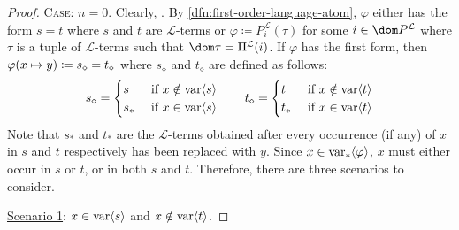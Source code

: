 \begin{proof}
    \vspace{0.3cm}
    \noindent
    {\scshape Case:} \( n = 0 \). Clearly, .
    By \cref{dfn:first-order-language-atom}, \( \varphi \) either has the form \( s = t \) where \( s \) and \( t \) are \( \mathcal{L} \)-terms
    or \( \varphi \coloneq P^{\mathcal{L}}_{i}(\tau) \) for some \( i \in \dom P^{\mathcal{L}} \) where \( \tau \) is a tuple of \( \mathcal{L} \)-terms such that
    \( \dom \tau = \Pi^{\mathcal{L}}(i) \).
    If \( \varphi \) has the first form, then \( \folfreevariablereplacement{\varphi}{x}{y} \coloneq s_{\diamond} = t_{\diamond} \) where \( s_{\diamond} \) and \( t_{\diamond} \)
    are defined as follows:
    \begin{equation}
        \label{eq:define-s-star-and-t-star-where-x-is-replaced-with-y}
        s_{\diamond} =
        \begin{cases}
            s \ &\text{if} \ x \notin \operatorname{var} \langle s\rangle \\
            s_{\ast} \ &\text{if} \ x \in \operatorname{var} \langle s\rangle
        \end{cases}
        \qquad
        t_{\diamond} =
        \begin{cases}
            t \ &\text{if} \ x \notin \operatorname{var} \langle t\rangle \\
            t_{\ast} \ &\text{if} \ x \in \operatorname{var} \langle t\rangle
        \end{cases}
    \end{equation}
    Note that \( s_{\ast} \) and \( t_{\ast} \) are the \( \mathcal{L} \)-terms obtained after every occurrence (if any) of \( x \) in \( s \) and \( t \)
    respectively has been replaced with \( y \).
    Since \( x \in \operatorname{var}_{\ast} \langle\varphi\rangle \), \( x \) must either occur in \( s \) or \( t \), or in both \( s \) and \( t \).
    Therefore, there are three scenarios to consider.

    \vspace{0.3cm}
    \noindent
    \underline{Scenario 1}: \( x \in \operatorname{var} \langle s\rangle \) and \( x \notin \operatorname{var} \langle t\rangle \).


\end{proof}
